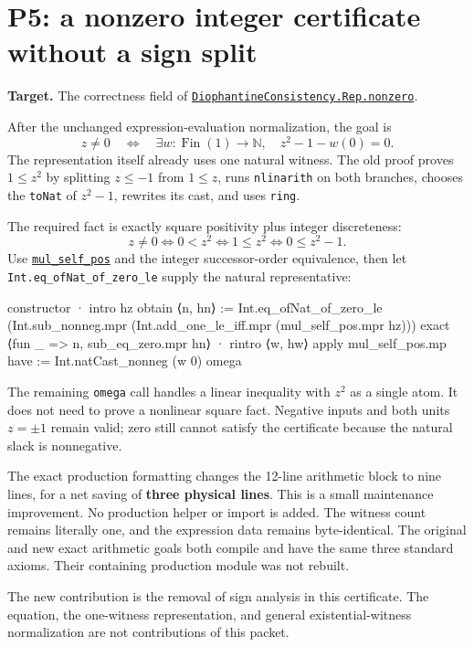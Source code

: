 \documentclass[11pt]{article}
\newcommand{\code}[1]{\nolinkurl{#1}}
\newcommand{\repo}[2]{\href{https://github.com/VladimirReshetnikov/ProveIt/blob/7df43cdfacb490cd3ca3acd23e39027efebf8801/Computability/DiophantineConsistency/#1}{#2}}
\newcommand{\ml}[2]{\href{https://github.com/leanprover-community/mathlib4/blob/81a5d257c8e410db227a6665ed08f64fea08e997/Mathlib/#1}{#2}}
\begin{document}
\section{P5: a nonzero integer certificate without a sign split}

\textbf{Target.} The correctness field of \repo{Lean/DiophantineConsistency/ArithmeticNonzero.lean}{\code{DiophantineConsistency.Rep.nonzero}}.

After the unchanged expression-evaluation normalization, the goal is
\[
 z\ne0\quad\Longleftrightarrow\quad
 \exists w:\operatorname{Fin}(1)\to\mathbb N,\quad z^2-1-w(0)=0.
\]
The representation itself already uses one natural witness. The old proof proves $1\le z^2$ by splitting $z\le-1$ from $1\le z$, runs \code{nlinarith} on both branches, chooses the \code{toNat} of $z^2-1$, rewrites its cast, and uses \code{ring}.

The required fact is exactly square positivity plus integer discreteness:
\[
 z\ne0 \iff 0<z^2 \iff 1\le z^2 \iff 0\le z^2-1.
\]
Use \ml{Algebra/Order/Ring/Unbundled/Basic.lean}{\code{mul_self_pos}} and the integer successor-order equivalence, then let \code{Int.eq_ofNat_of_zero_le} supply the natural representative:

\begin{Lean}
    constructor
    · intro hz
      obtain ⟨n, hn⟩ := Int.eq_ofNat_of_zero_le
        (Int.sub_nonneg.mpr
          (Int.add_one_le_iff.mpr (mul_self_pos.mpr hz)))
      exact ⟨fun _ => n, sub_eq_zero.mpr hn⟩
    · rintro ⟨w, hw⟩
      apply mul_self_pos.mp
      have := Int.natCast_nonneg (w 0)
      omega
\end{Lean}

The remaining \code{omega} call handles a linear inequality with $z^2$ as a single atom. It does not need to prove a nonlinear square fact. Negative inputs and both units $z=\pm1$ remain valid; zero still cannot satisfy the certificate because the natural slack is nonnegative.

The exact production formatting changes the 12-line arithmetic block to nine lines, for a net saving of \textbf{three physical lines}. This is a small maintenance improvement. No production helper or import is added. The witness count remains literally one, and the expression data remains byte-identical. The original and new exact arithmetic goals both compile and have the same three standard axioms. Their containing production module was not rebuilt.

The new contribution is the removal of sign analysis in this certificate. The equation, the one-witness representation, and general existential-witness normalization are not contributions of this packet.
\end{document}
